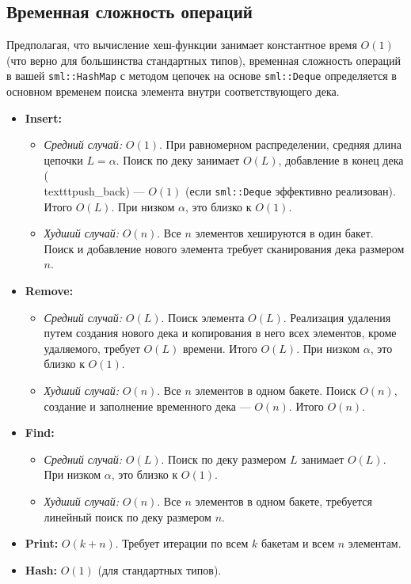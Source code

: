 \documentclass[a4paper,12pt]{article}
\begin{document}
\subsection{Временная сложность операций}

Предполагая, что вычисление хеш-функции занимает константное время \(O(1)\) (что верно для большинства стандартных типов), временная сложность операций в вашей \texttt{sml::HashMap} с методом цепочек на основе \texttt{sml::Deque} определяется в основном временем поиска элемента внутри соответствующего дека.

\begin{itemize}
    \item \textbf{Insert:}
    \begin{itemize}
        \item \textit{Средний случай:} \(O(1)\). При равномерном распределении, средняя длина цепочки \(L = \alpha\). Поиск по деку занимает \(O(L)\), добавление в конец дека (\\texttt{push\_back}) --- \(O(1)\) (если \texttt{sml::Deque} эффективно реализован). Итого \(O(L)\). При низком \(\alpha\), это близко к \(O(1)\).
        \item \textit{Худший случай:} \(O(n)\). Все \(n\) элементов хешируются в один бакет. Поиск и добавление нового элемента требует сканирования дека размером \(n\).
    \end{itemize}
    \item \textbf{Remove:}
    \begin{itemize}
        \item \textit{Средний случай:} \(O(L)\). Поиск элемента \(O(L)\). Реализация удаления путем создания нового дека и копирования в него всех элементов, кроме удаляемого, требует \(O(L)\) времени. Итого \(O(L)\). При низком \(\alpha\), это близко к \(O(1)\).
        \item \textit{Худший случай:} \(O(n)\). Все \(n\) элементов в одном бакете. Поиск \(O(n)\), создание и заполнение временного дека --- \(O(n)\). Итого \(O(n)\).
    \end{itemize}
    \item \textbf{Find:}
    \begin{itemize}
        \item \textit{Средний случай:} \(O(L)\). Поиск по деку размером \(L\) занимает \(O(L)\). При низком \(\alpha\), это близко к \(O(1)\).
        \item \textit{Худший случай:} \(O(n)\). Все \(n\) элементов в одном бакете, требуется линейный поиск по деку размером \(n\).
    \end{itemize}
    \item \textbf{Print:} \(O(k + n)\). Требует итерации по всем \(k\) бакетам и всем \(n\) элементам.
    \item \textbf{Hash:} \(O(1)\) (для стандартных типов).
\end{itemize}
\end{document}
